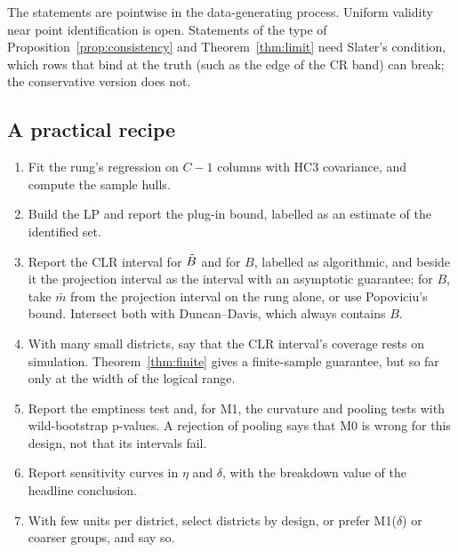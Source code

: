 The statements are pointwise in the data-generating process. Uniform validity near
point identification is open. Statements of the type of
Proposition~\ref{prop:consistency} and Theorem~\ref{thm:limit} need Slater's
condition, which rows that bind at the truth (such as the edge of the CR band) can
break; the conservative version does not.

\subsection{A practical recipe}

\begin{enumerate}
\item Fit the rung's regression on $C-1$ columns with HC3 covariance, and compute
the sample hulls.
\item Build the LP and report the plug-in bound, labelled as an estimate of the
identified set.
\item Report the CLR interval for $\tilde B$ and for $B$, labelled as algorithmic, and
beside it the projection interval as the interval with an asymptotic guarantee;
for $B$, take $\bar m$ from the projection interval on the rung alone, or use
Popoviciu's bound. Intersect both with Duncan--Davis, which always contains $B$.
\item With many small districts, say that the CLR interval's coverage rests on
simulation. Theorem~\ref{thm:finite} gives a finite-sample guarantee, but so far
only at the width of the logical range.
\item Report the emptiness test and, for M1, the curvature and pooling tests with
wild-bootstrap p-values. A rejection of pooling says that M0 is wrong for this
design, not that its intervals fail.
\item Report sensitivity curves in $\eta$ and $\delta$, with the breakdown value of
the headline conclusion.
\item With few units per district, select districts by design, or prefer
M1($\delta$) or coarser groups, and say so.
\end{enumerate}
